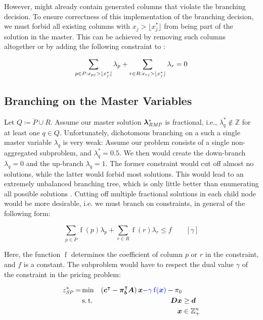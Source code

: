 However, \RMP{} might already contain generated columns that violate the branching decision. To ensure correctness of this implementation of the branching decision, we must forbid all existing columns with $x_j > \lfloor x_j^* \rfloor$ from being part of the solution in the master. This can be achieved by removing such columns altogether or by adding the following constraint to \MP{}:

\begin{equation}
\sum_{p \in P: x_{pj} > \lfloor x_j^*\rfloor} \lambda_p + \sum_{r \in R: x_{rj} > \lfloor x_j^*\rfloor} \lambda_r = 0
\end{equation}

\subsection{Branching on the Master Variables}\label{sec:cg_bp_bp_branching_master}
Let $Q \coloneqq \ddot{P} \cup R$. Assume our master solution ${\bm{\lambda}}^*_{\textit{RMP}}{}$ is fractional, i.e., $\lambda_q^* \not\in \mathbb{Z}$ for at least one $q \in Q$. Unfortunately, dichotomous branching on a such a single master variable $\lambda_q$ is very weak: Assume our problem consists of a single non-aggregated subproblem, and $\lambda_q^* = 0.5$. We then would create the down-branch $\lambda_q = 0$ and the up-branch $\lambda_q = 1$. The former constraint would cut off almost no solutions, while the latter would forbid most solutions. This would lead to an extremely unbalanced branching tree, which is only little better than enumerating all possible solutions \cite{thebook}. Cutting off multiple fractional solutions in each child node would be more desirable, i.e. we must branch on constraints, in general of the following form:

\begin{equation*}
\sum_{p \in \ddot{P}} \operatorname{f}(p) \lambda_p + \sum_{r \in R} \operatorname{f}(r) \lambda_r \leq f \qquad \left[\gamma\right]
\end{equation*}

Here, the function $\operatorname{f}$ determines the coefficient of column $p$ or $r$ in the constraint, and $f$ is a constant. The subproblem would have to respect the dual value $\gamma$ of the constraint in the pricing problem:

\begin{equation*}
\begin{aligned}
z^*_\SP{} = &\min & \left( \vec{c}\transpose - \vec{\pi}_\vec{b}\transpose \mat{A} \right) \vec{x} {\color{blue} - \gamma \operatorname{f}(\vec{x})} - \pi_0 & \\
&\st & \mat{D} \vec{x} & \geq \vec{d} \\
&& \vec{x} & \in \mathbb{Z}_+^n
\end{aligned}
\end{equation*}

